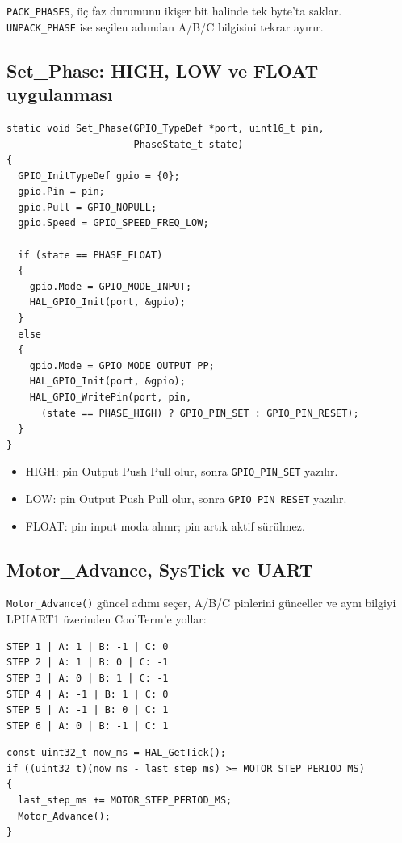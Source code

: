 \documentclass[11pt,a4paper]{article}
\begin{document}
\texttt{PACK\_PHASES}, üç faz durumunu ikişer bit halinde tek byte'ta saklar.
\texttt{UNPACK\_PHASE} ise seçilen adımdan A/B/C bilgisini tekrar ayırır.

\subsection{Set\_Phase: HIGH, LOW ve FLOAT uygulanması}

\begin{lstlisting}
static void Set_Phase(GPIO_TypeDef *port, uint16_t pin,
                      PhaseState_t state)
{
  GPIO_InitTypeDef gpio = {0};
  gpio.Pin = pin;
  gpio.Pull = GPIO_NOPULL;
  gpio.Speed = GPIO_SPEED_FREQ_LOW;

  if (state == PHASE_FLOAT)
  {
    gpio.Mode = GPIO_MODE_INPUT;
    HAL_GPIO_Init(port, &gpio);
  }
  else
  {
    gpio.Mode = GPIO_MODE_OUTPUT_PP;
    HAL_GPIO_Init(port, &gpio);
    HAL_GPIO_WritePin(port, pin,
      (state == PHASE_HIGH) ? GPIO_PIN_SET : GPIO_PIN_RESET);
  }
}
\end{lstlisting}

\begin{itemize}
  \item HIGH: pin Output Push Pull olur, sonra \texttt{GPIO\_PIN\_SET} yazılır.
  \item LOW: pin Output Push Pull olur, sonra \texttt{GPIO\_PIN\_RESET} yazılır.
  \item FLOAT: pin input moda alınır; pin artık aktif sürülmez.
\end{itemize}

\subsection{Motor\_Advance, SysTick ve UART}

\texttt{Motor\_Advance()} güncel adımı seçer, A/B/C pinlerini günceller ve aynı
bilgiyi LPUART1 üzerinden CoolTerm'e yollar:

\begin{lstlisting}
STEP 1 | A: 1 | B: -1 | C: 0
STEP 2 | A: 1 | B: 0 | C: -1
STEP 3 | A: 0 | B: 1 | C: -1
STEP 4 | A: -1 | B: 1 | C: 0
STEP 5 | A: -1 | B: 0 | C: 1
STEP 6 | A: 0 | B: -1 | C: 1
\end{lstlisting}

\begin{lstlisting}
const uint32_t now_ms = HAL_GetTick();
if ((uint32_t)(now_ms - last_step_ms) >= MOTOR_STEP_PERIOD_MS)
{
  last_step_ms += MOTOR_STEP_PERIOD_MS;
  Motor_Advance();
}
\end{lstlisting}
\end{document}
